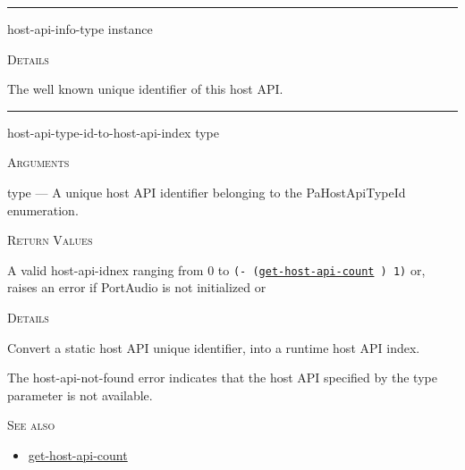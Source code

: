 \documentclass[a4paper]{report}
\begin{document}
  

    \rule{\linewidth}{0.1mm}
    
    \label{portaudio__fun__host-api-info-type}
    \begin{defun}[Function]
    host-api-info-type instance


	
    \bigskip
    \textsc{Details}

The well known unique identifier of this host API.


    
    \end{defun}
  
  

    \rule{\linewidth}{0.1mm}
    
    \label{portaudio__fun__host-api-type-id-to-host-api-index}
    \begin{defun}[Function]
    host-api-type-id-to-host-api-index type


    
    \bigskip
    \textsc{Arguments}

type
	--- A unique host API identifier belonging to the PaHostApiTypeId enumeration.




    
    \bigskip
    \textsc{Return Values}

A valid host-api-idnex ranging from 0 to \texttt{(- (\hyperref[portaudio__fun__get-host-api-count]{\texttt{get-host-api-count}}
  ) 1)} or, raises an error if PortAudio is not initialized or


	
    \bigskip
    \textsc{Details}

Convert a static host API unique identifier, into a runtime host API index.




The host-api-not-found error indicates that the host API specified by the type parameter is not available.




      
    \bigskip
    \textsc{See also}


	
    \begin{itemize}
    
	  
    \item
    \hyperref[portaudio__fun__get-host-api-count]{get-host-api-count}
    
	
    \end{itemize}
  
      


    
    \end{defun}
  
\end{document}
